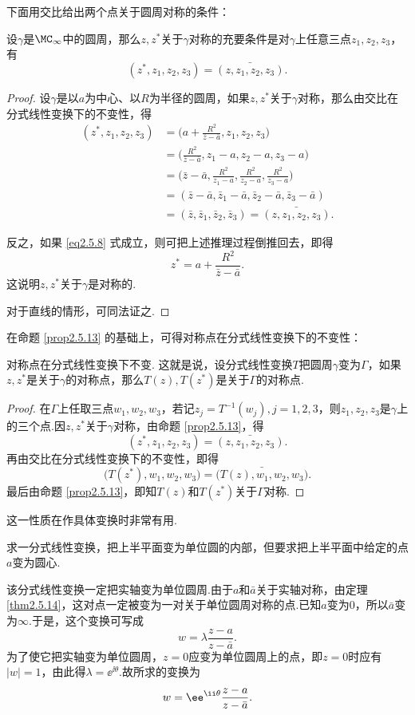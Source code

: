 下面用交比给出两个点关于圆周对称的条件：
\begin{prop}\label{prop2.5.13}
设$\gamma$是$\MC_\infty$中的圆周，那么$z,z^\ast$关于$\gamma$对称的充要条件是对$\gamma$上任意三点$z_1,z_2,z_3$，有
\begin{equation}\label{eq2.5.8}
(z^\ast,z_1,z_2,z_3)=\bar{(z,z_1,z_2,z_3)}.
\end{equation}
\end{prop}
\begin{proof}
设$\gamma$是以$a$为中心、以$R$为半径的圆周，如果$z,z^\ast$关于$\gamma$对称，那么由交比在分式线性变换下的不变性，得
\begin{align*}
(z^\ast,z_1,z_2,z_3)&=\bigg(a+\frac{R^2}{\bar z-\bar a},z_1,z_2,z_3\bigg)\\
&=\bigg(\frac{R^2}{\bar z-\bar a},z_1-a,z_2-a,z_3-a\bigg)\\
&=\bigg(\bar z-\bar a,\frac{R^2}{z_1-a},\frac{R^2}{z_2-a},\frac{R^2}{z_3-a}\bigg)\\
&=(\bar z-\bar a,\bar z_1-\bar a,\bar z_2-\bar a,\bar z_3-\bar a)\\
&=(\bar z,\bar z_1,\bar z_2,\bar z_3)=\bar{(z,z_1,z_2,z_3)}.
\end{align*}

反之，如果 \eqref{eq2.5.8} 式成立，则可把上述推理过程倒推回去，即得
\[z^\ast=a+\frac{R^2}{\bar z-\bar a}.\]
这说明$z,z^\ast$关于$\gamma$是对称的.

对于直线的情形，可同法证之.
\end{proof}

在命题 \ref{prop2.5.13} 的基础上，可得对称点在分式线性变换下的不变性：
\begin{theorem}\label{thm2.5.14}
对称点在分式线性变换下不变. 这就是说，设分式线性变换$T$把圆周$\gamma$变为$\Gamma$，如果$z,z^\ast$是关于$\gamma$的对称点，那么$T(z),T(z^\ast)$是关于$\Gamma$的对称点.
\end{theorem}
\begin{proof}
在$\Gamma$上任取三点$w_1,w_2,w_3$，若记$z_j=T^{-1}(w_j),j=1,2,3$，则$z_1,z_2,z_3$是$\gamma$上的三个点.因$z,z^\ast$关于$\gamma$对称，由命题 \ref{prop2.5.13}，得
\[(z^\ast,z_1,z_2,z_3)=\bar{(z,z_1,z_2,z_3)}.\]
再由交比在分式线性变换下的不变性，即得
\[\big(T(z^\ast),w_1,w_2,w_3\big)=\bar{\big(T(z),w_1,w_2,w_3\big)}.\]
最后由命题 \ref{prop2.5.13}，即知$T(z)$和$T(z^\ast)$关于$\Gamma$对称.
\end{proof}

这一性质在作具体变换时非常有用.
\begin{example}\label{exam2.5.15}
求一分式线性变换，把上半平面变为单位圆的内部，但要求把上半平面中给定的点$a$变为圆心.
\end{example}
\begin{solution}
该分式线性变换一定把实轴变为单位圆周.由于$a$和$\bar a$关于实轴对称，由定理 \ref{thm2.5.14}，这对点一定被变为一对关于单位圆周对称的点.已知$a$变为$0$，所以$\bar a$变为$\infty$.于是，这个变换可写成
\[w=\lambda\frac{z-a}{z-\bar a}.\]
为了使它把实轴变为单位圆周，$z=0$应变为单位圆周上的点，即$z=0$时应有$|w|=1$，由此得$\lambda=\ee^{\ii\theta}$.故所求的变换为
\[
  w = \ee^{\ii\theta} \frac{z-a}{z-\bar a}. \qedhere
\]
\end{solution}

